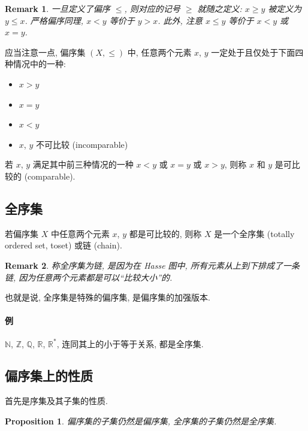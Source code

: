 \documentclass[UTF8]{ctexart}
\theoremstyle{mystyle}
\newtheorem{proposition}{Proposition}[section]
\theoremstyle{myremark}
\newtheorem*{remark}{Remark}
\theoremstyle{plain}
\newcommand{\R}{\mathbb R}
\newcommand{\Z}{\mathbb Z}
\newcommand{\N}{\mathbb N}
\newcommand{\Q}{\mathbb Q}
\begin{document}
\begin{remark}
    一旦定义了偏序 $ \le $, 则对应的记号 $ \ge $ 就随之定义: $ x \ge y $ 被定义为 $ y \le x $. 严格偏序同理, $ x < y $ 等价于 $ y > x $. 此外, 注意 $ x \le y $ 等价于 $ x < y $ 或 $ x = y $.
\end{remark}

应当注意一点, 偏序集 $ (X, \le) $ 中, 任意两个元素 $ x $, $ y $ 一定处于且仅处于下面四种情况中的一种:
\begin{itemize}
    \item $ x > y $
    \item $ x = y $
    \item $ x < y $
    \item $ x $, $ y $ 不可比较 (incomparable)
\end{itemize}

若 $ x $, $ y $ 满足其中前三种情况的一种 $ x < y $ 或 $ x = y $ 或 $ x > y $, 则称 $ x $ 和 $ y $ 是可比较的 (comparable).

\subsection{全序集}
\begin{definition}
    若偏序集 $ X $ 中任意两个元素 $ x $, $ y $ 都是可比较的, 则称 $ X $ 是一个全序集 (totally ordered set, toset) 或链 (chain).
\end{definition}

\begin{remark}
    称全序集为链, 是因为在 Hasse 图中, 所有元素从上到下排成了一条链, 因为任意两个元素都是可以``比较大小''的.
\end{remark}

也就是说, 全序集是特殊的偏序集, 是偏序集的加强版本.

\paragraph{例}
$ \N $, $ \Z $, $ \Q $, $ \R $, $ \R^* $, 连同其上的小于等于关系, 都是全序集.


\subsection{偏序集上的性质}
首先是序集及其子集的性质.

\begin{proposition}
    偏序集的子集仍然是偏序集, 全序集的子集仍然是全序集.
\end{proposition}
\end{document}
